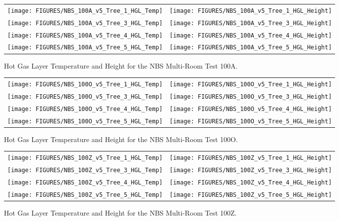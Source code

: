 \begin{figure}[p]
\begin{tabular*}{\textwidth}{l@{\extracolsep{\fill}}r}
\texttt{[image: FIGURES/NBS\_100A\_v5\_Tree\_1\_HGL\_Temp]} &
\texttt{[image: FIGURES/NBS\_100A\_v5\_Tree\_1\_HGL\_Height]} \\
\texttt{[image: FIGURES/NBS\_100A\_v5\_Tree\_3\_HGL\_Temp]} &
\texttt{[image: FIGURES/NBS\_100A\_v5\_Tree\_3\_HGL\_Height]} \\
\texttt{[image: FIGURES/NBS\_100A\_v5\_Tree\_4\_HGL\_Temp]} &
\texttt{[image: FIGURES/NBS\_100A\_v5\_Tree\_4\_HGL\_Height]} \\
\texttt{[image: FIGURES/NBS\_100A\_v5\_Tree\_5\_HGL\_Temp]} &
\texttt{[image: FIGURES/NBS\_100A\_v5\_Tree\_5\_HGL\_Height]}
\end{tabular*}
\caption{Hot Gas Layer Temperature and Height for the NBS Multi-Room Test 100A.} \label{NBS_100A_HGL}
\end{figure}

\begin{figure}[p]
\begin{tabular*}{\textwidth}{l@{\extracolsep{\fill}}r}
\texttt{[image: FIGURES/NBS\_100O\_v5\_Tree\_1\_HGL\_Temp]} &
\texttt{[image: FIGURES/NBS\_100O\_v5\_Tree\_1\_HGL\_Height]} \\
\texttt{[image: FIGURES/NBS\_100O\_v5\_Tree\_3\_HGL\_Temp]} &
\texttt{[image: FIGURES/NBS\_100O\_v5\_Tree\_3\_HGL\_Height]} \\
\texttt{[image: FIGURES/NBS\_100O\_v5\_Tree\_4\_HGL\_Temp]} &
\texttt{[image: FIGURES/NBS\_100O\_v5\_Tree\_4\_HGL\_Height]} \\
\texttt{[image: FIGURES/NBS\_100O\_v5\_Tree\_5\_HGL\_Temp]} &
\texttt{[image: FIGURES/NBS\_100O\_v5\_Tree\_5\_HGL\_Height]}
\end{tabular*}
\caption{Hot Gas Layer Temperature and Height for the NBS Multi-Room Test 100O.} \label{NBS_100O_HGL}
\end{figure}

\begin{figure}[p]
\begin{tabular*}{\textwidth}{l@{\extracolsep{\fill}}r}
\texttt{[image: FIGURES/NBS\_100Z\_v5\_Tree\_1\_HGL\_Temp]} &
\texttt{[image: FIGURES/NBS\_100Z\_v5\_Tree\_1\_HGL\_Height]} \\
\texttt{[image: FIGURES/NBS\_100Z\_v5\_Tree\_3\_HGL\_Temp]} &
\texttt{[image: FIGURES/NBS\_100Z\_v5\_Tree\_3\_HGL\_Height]} \\
\texttt{[image: FIGURES/NBS\_100Z\_v5\_Tree\_4\_HGL\_Temp]} &
\texttt{[image: FIGURES/NBS\_100Z\_v5\_Tree\_4\_HGL\_Height]} \\
\texttt{[image: FIGURES/NBS\_100Z\_v5\_Tree\_5\_HGL\_Temp]} &
\texttt{[image: FIGURES/NBS\_100Z\_v5\_Tree\_5\_HGL\_Height]}
\end{tabular*}
\caption{Hot Gas Layer Temperature and Height for the NBS Multi-Room Test 100Z.} \label{NBS_100Z_HGL}
\end{figure}

\clearpage
